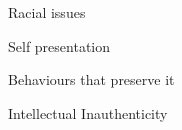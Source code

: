 \documentclass[aspectratio=169]{beamer}
\begin{document}
\begin{frame}
  \begin{center}
    \Huge Racial issues
    \\ \small \cite{colour}
  \end{center}
\end{frame}

\begin{frame}
  \begin{center}
    \Huge Self presentation
    \\ \small \cite{sakulku11}
  \end{center}
\end{frame}

\begin{frame}
  \begin{center}
    \Huge Behaviours that preserve it
  \end{center}
\end{frame}

\begin{frame}
  \begin{center}
    \Huge Intellectual Inauthenticity
    \\ \small \cite{clanceimes78}
  \end{center}
\end{frame}
\end{document}
